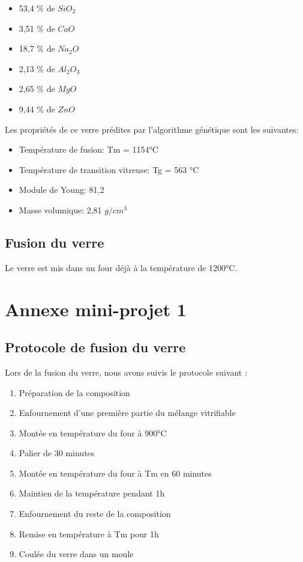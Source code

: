 \documentclass{article}
\begin{document}
\begin{itemize}
    \item 53,4 \% de $SiO_2$
    \item 3,51 \% de $CaO$
    \item 18,7 \% de $Na_2O$
    \item 2,13 \% de $Al_2O_3$
    \item 2,65 \% de $MgO$
    \item 9,44 \% de $ZnO$
\end{itemize}

Les propriétés de ce verre prédites par l'algorithme génétique sont les suivantes:
\begin{itemize}
    \item Température de fusion: Tm = 1154°C
    \item Température de transition vitreuse: Tg = 563 °C 
    \item Module de Young: 81,2
    \item Masse volumique: 2,81 $g/cm^{3}$
\end{itemize}

\subsection{Fusion du verre}

Le verre est mis dans un four déjà à la température de 1200°C.

\section{Annexe mini-projet 1}
\subsection{Protocole de fusion du verre}

Lors de la fusion du verre, nous avons suivis le protocole suivant :

\begin{enumerate}
    \item Préparation de la composition
    \item Enfournement d'une première partie du mélange vitrifiable
    \item Montée en température du four à 900°C
    \item Palier de 30 minutes
    \item Montée en température du four à Tm en 60 minutes
    \item Maintien de la température pendant 1h
    \item Enfournement du reste de la composition
    \item Remise en température à Tm pour 1h
    \item Coulée du verre dans un moule
\end{enumerate}
\end{document}
